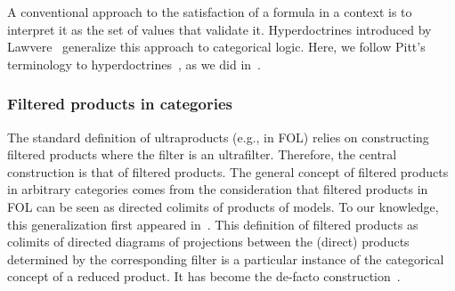 \documentclass[preprint,3p,times]{elsarticle}
\begin{document}
A conventional approach to the satisfaction of a formula in a context is to interpret it as the set of values that validate it. Hyperdoctrines introduced by Lawvere~\cite{Law69,Law70} generalize this approach to categorical logic. Here, we follow Pitt's terminology to hyperdoctrines~\cite{Pit95}, as we did in~\cite{AB23}.

\subsubsection{Filtered products in categories}
\label{sec:filteredproducts}

The standard definition of ultraproducts (e.g., in FOL) relies on constructing filtered products where the filter is an ultrafilter. Therefore, the central construction is that of filtered products. The general concept of filtered products in arbitrary categories comes from the consideration that filtered products in FOL can be seen as directed colimits of products of models. To our knowledge, this generalization first appeared in~\cite{Okh66}. This definition of filtered products as colimits of directed diagrams of projections between the (direct) products determined by the corresponding filter is a particular instance of the categorical concept of a reduced product. It has become the de-facto construction~\cite{AN78,Dia08,Dia17}.
\end{document}
